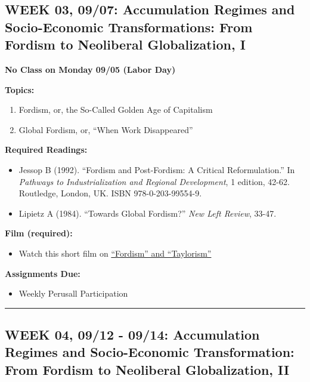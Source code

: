 \documentclass[11pt,]{article}
\providecommand{\tightlist}{%
  \setlength{\itemsep}{0pt}\setlength{\parskip}{0pt}}
\begin{document}
\hypertarget{week-03-0907-accumulation-regimes-and-socio-economic-transformations-from-fordism-to-neoliberal-globalization-i}{%
\subsection{WEEK 03, 09/07: Accumulation Regimes and Socio-Economic
Transformations: From Fordism to Neoliberal Globalization,
I}\label{week-03-0907-accumulation-regimes-and-socio-economic-transformations-from-fordism-to-neoliberal-globalization-i}}

\colorbox{Melon}{\bf{No Class on Monday 09/05 (Labor Day)}}

\textbf{Topics:}

\begin{enumerate}
\def\labelenumi{(\arabic{enumi})}
\tightlist
\item
  Fordism, or, the So-Called Golden Age of Capitalism
\item
  Global Fordism, or, ``When Work Disappeared''
\end{enumerate}

\textbf{Required Readings:}

\begin{itemize}
\item
  Jessop B (1992). ``Fordism and Post-Fordism: A Critical
  Reformulation.'' In \emph{Pathways to Industrialization and Regional
  Development}, 1 edition, 42-62. Routledge, London, UK. ISBN
  978-0-203-99554-9.
\item
  Lipietz A (1984). ``Towards Global Fordism?'' \emph{New Left Review},
  33-47.
\end{itemize}

\textbf{Film (required):}

\begin{itemize}
\tightlist
\item
  Watch this short film on
  \href{https://www.youtube.com/watch?v=8PdmNbqtDdI}{``Fordism'' and
  ``Taylorism''}
\end{itemize}

\textbf{Assignments Due:}

\begin{itemize}
\tightlist
\item
  Weekly Perusall Participation
\end{itemize}

\bigbreak
\hrule

\hypertarget{week-04-0912---0914-accumulation-regimes-and-socio-economic-transformation-from-fordism-to-neoliberal-globalization-ii}{%
\subsection{WEEK 04, 09/12 - 09/14: Accumulation Regimes and
Socio-Economic Transformation: From Fordism to Neoliberal Globalization,
II}\label{week-04-0912---0914-accumulation-regimes-and-socio-economic-transformation-from-fordism-to-neoliberal-globalization-ii}}
\end{document}
